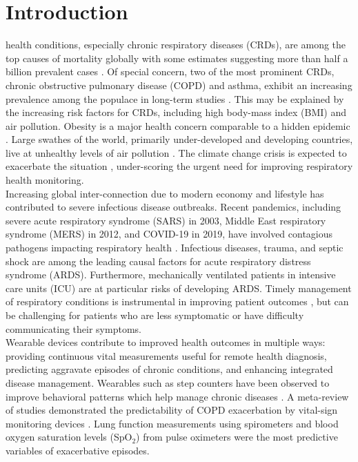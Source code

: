 \documentclass[journal]{IEEEtran}
\begin{document}
\section{Introduction}
 health conditions, especially chronic respiratory diseases (CRDs), are among the top causes of mortality globally with some estimates suggesting more than half a billion prevalent cases \cite{viegiGlobalBurdenChronic2020}. Of special concern, two of the most prominent CRDs, chronic obstructive pulmonary disease (COPD) and asthma, exhibit an increasing prevalence among the populace in long-term studies \cite{boersGlobalBurdenChronic2023}. This may be explained by the increasing risk factors for CRDs, including high body-mass index (BMI) and air pollution. Obesity is a major health concern comparable to a hidden epidemic \cite{boutari2022UpdateEpidemiology2022}. Large swathes of the world, primarily under-developed and developing countries, live at unhealthy levels of air pollution \cite{rentschlerGlobalAirPollution2023}. The climate change crisis is expected to exacerbate the situation \cite{andersenClimateChangeRespiratory2023}, under-scoring the urgent need for improving respiratory health monitoring. \\
Increasing global inter-connection due to modern economy and lifestyle has contributed to severe infectious disease outbreaks. Recent pandemics, including severe acute respiratory syndrome (SARS) in 2003, Middle East respiratory syndrome (MERS) in 2012, and COVID-19 in 2019, have involved contagious pathogens impacting respiratory health \cite{bakerInfectiousDiseaseEra2022}. Infectious diseases, trauma, and septic shock are among the leading causal factors for acute respiratory distress syndrome (ARDS). Furthermore, mechanically ventilated patients in intensive care units (ICU) are at particular risks of developing ARDS. Timely management of respiratory conditions is instrumental in improving patient outcomes \cite{leffCOPDClinicalSignificance2005} \cite{arriveEarlyIdentificationDiagnostic2021}, but can be challenging for patients who are less symptomatic or have difficulty communicating their symptoms. \\
Wearable devices contribute to improved health outcomes in multiple ways: providing continuous vital measurements useful for remote health diagnosis, predicting aggravate episodes of chronic conditions, and enhancing integrated disease management. Wearables such as step counters have been observed to improve behavioral patterns which help manage chronic diseases \cite{shahWearableTechnologyInterventions2023}. A meta-review of studies demonstrated the predictability of COPD exacerbation by vital-sign monitoring devices \cite{alrajehMonitoringPhysiologicalParameters2016}. Lung function measurements using spirometers and blood oxygen saturation levels (SpO$_2$) from pulse oximeters were the most predictive variables of exacerbative episodes. \\
\end{document}
